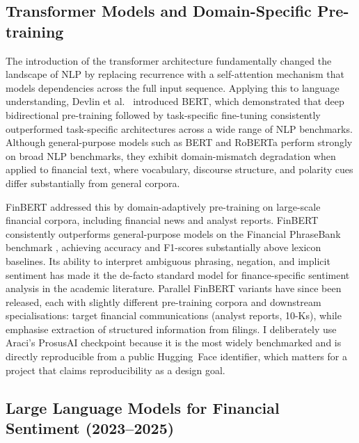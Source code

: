 \subsection*{Transformer Models and Domain-Specific Pre-training}

The introduction of the transformer architecture \citep{vaswani2017attention} fundamentally changed the landscape of NLP by replacing recurrence with a self-attention mechanism that models dependencies across the full input sequence.  Applying this to language understanding, Devlin et al.\ \citep{devlin2019bert} introduced BERT, which demonstrated that deep bidirectional pre-training followed by task-specific fine-tuning consistently outperformed task-specific architectures across a wide range of NLP benchmarks.  Although general-purpose models such as BERT and RoBERTa \citep{liu2019roberta} perform strongly on broad NLP benchmarks, they exhibit domain-mismatch degradation when applied to financial text, where vocabulary, discourse structure, and polarity cues differ substantially from general corpora.

FinBERT \citep{araci2019finbert} addressed this by domain-adaptively pre-training on large-scale financial corpora, including financial news and analyst reports.  FinBERT consistently outperforms general-purpose models on the Financial PhraseBank benchmark \citep{malo2014financialphrasebank}, achieving accuracy and F1-scores substantially above lexicon baselines.  Its ability to interpret ambiguous phrasing, negation, and implicit sentiment has made it the de-facto standard model for finance-specific sentiment analysis in the academic literature. Parallel FinBERT variants have since been released, each with slightly different pre-training corpora and downstream specialisations: \citet{yang2020finbert} target financial communications (analyst reports, 10-Ks), while \citet{huang2023finbert} emphasise extraction of structured information from filings. I deliberately use Araci's ProsusAI checkpoint because it is the most widely benchmarked and is directly reproducible from a public Hugging~Face identifier, which matters for a project that claims reproducibility as a design goal.

\subsection*{Large Language Models for Financial Sentiment (2023--2025)}

